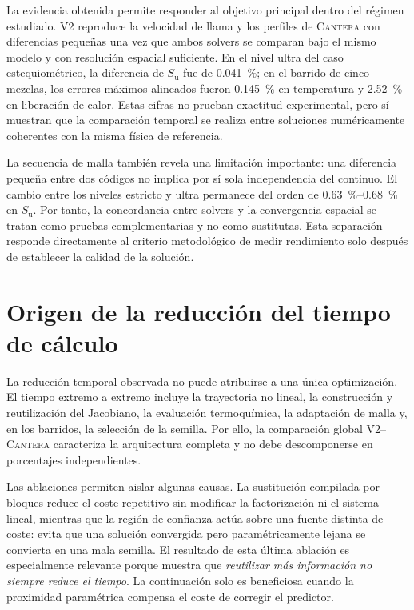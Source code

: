 \documentclass[12pt,a4paper,twoside,openany]{book}
\newcommand{\Su}{S_{\mathrm{u}}}
\newcommand{\Vdos}{\textsc{V2}\xspace}
\newcommand{\Cantera}{\textsc{Cantera}\xspace}
\begin{document}
La evidencia obtenida permite responder al objetivo principal dentro del régimen
estudiado. \Vdos reproduce la velocidad de llama y los perfiles de \Cantera con
diferencias pequeñas una vez que ambos solvers se comparan bajo el mismo modelo
y con resolución espacial suficiente. En el nivel ultra del caso
estequiométrico, la diferencia de \(\Su\) fue de \SI{0.041}{\percent}; en el
barrido de cinco mezclas, los errores máximos alineados fueron
\SI{0.145}{\percent} en temperatura y \SI{2.52}{\percent} en liberación de
calor. Estas cifras no prueban exactitud experimental, pero sí muestran que la
comparación temporal se realiza entre soluciones numéricamente coherentes con la
misma física de referencia.

La secuencia de malla también revela una limitación importante: una diferencia
pequeña entre dos códigos no implica por sí sola independencia del continuo. El
cambio entre los niveles estricto y ultra permanece del orden de
\SIrange{0.63}{0.68}{\percent} en \(\Su\). Por tanto, la concordancia entre
solvers y la convergencia espacial se tratan como pruebas complementarias y no
como sustitutas. Esta separación responde directamente al criterio metodológico
de medir rendimiento solo después de establecer la calidad de la solución.

\section{Origen de la reducción del tiempo de cálculo}

La reducción temporal observada no puede atribuirse a una única optimización.
El tiempo extremo a extremo incluye la trayectoria no lineal, la construcción y
reutilización del Jacobiano, la evaluación termoquímica, la adaptación de malla
y, en los barridos, la selección de la semilla. Por ello, la comparación global
\Vdos--\Cantera caracteriza la arquitectura completa y no debe descomponerse en
porcentajes independientes.

Las ablaciones permiten aislar algunas causas. La sustitución compilada por
bloques reduce el coste repetitivo sin modificar la factorización ni el sistema
lineal, mientras que la región de confianza actúa sobre una fuente distinta de
coste: evita que una solución convergida pero paramétricamente lejana se convierta
en una mala semilla. El resultado de esta última ablación es especialmente
relevante porque muestra que \emph{reutilizar más información no siempre reduce
el tiempo}. La continuación solo es beneficiosa cuando la proximidad paramétrica
compensa el coste de corregir el predictor.
\end{document}
